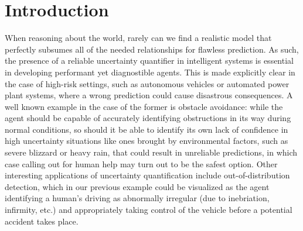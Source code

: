 \chapter{Introduction}






When reasoning about the world, rarely can we find a realistic model that perfectly subsumes all of
the needed relationships for flawless prediction. As such, the presence of a reliable uncertainty
quantifier in intelligent systems is essential in developing performant yet diagnostible agents.
This is made explicitly clear in the case of high-risk settings, such as autonomous vehicles or
automated power plant systems, where a wrong prediction could cause disastrous consequences. A well
known example in the case of the former is obstacle avoidance: while the agent should be capable of
accurately identifying obstructions in its way during normal conditions, so should it be able to
identify its own lack of confidence in high uncertainty situations like ones brought by
environmental factors, such as severe blizzard or heavy rain, that could result in unreliable
predictions, in which case calling out for human help may turn out to be the safest option. Other
interesting applications of uncertainty quantification include out-of-distribution detection, which
in our previous example could be visualized as the agent identifying a human's driving as
abnormally irregular (due to inebriation, infirmity, etc.) and appropriately taking control of the
vehicle before a potential accident takes place.

